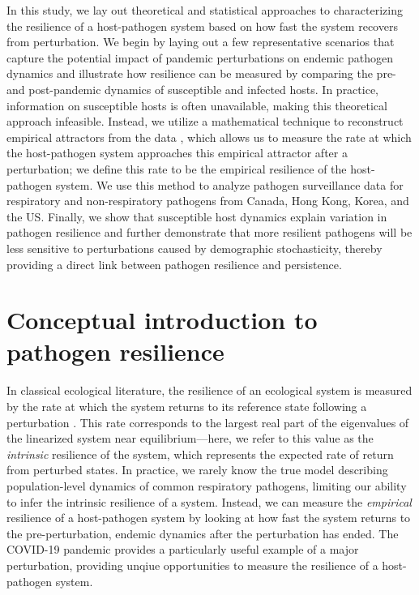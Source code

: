 \documentclass[12pt]{article}
\begin{document}
In this study, we lay out theoretical and statistical approaches to characterizing the resilience of a host-pathogen system based on how fast the system recovers from perturbation.
We begin by laying out a few representative scenarios that capture the potential impact of pandemic perturbations on endemic pathogen dynamics and illustrate how resilience can be measured by comparing the pre- and post-pandemic dynamics of susceptible and infected hosts.
In practice, information on susceptible hosts is often unavailable, making this theoretical approach infeasible.
Instead, we utilize a mathematical technique to reconstruct empirical attractors from the data \citep{takens2006detecting}, which allows us to measure the rate at which the host-pathogen system approaches this empirical attractor after a perturbation;
we define this rate to be the empirical resilience of the host-pathogen system.
We use this method to analyze pathogen surveillance data for respiratory and non-respiratory pathogens from Canada, Hong Kong, Korea, and the US.
Finally, we show that susceptible host dynamics explain variation in pathogen resilience and further demonstrate that more resilient pathogens will be less sensitive to perturbations caused by demographic stochasticity, thereby providing a direct link between pathogen resilience and persistence. 
 
\section*{Conceptual introduction to pathogen resilience}

In classical ecological literature, the resilience of an ecological system is measured by the rate at which the system returns to its reference state following a perturbation \citep{pimm1979structure, neubert1997alternatives,gunderson2000ecological,dakos2022ecological}.
This rate corresponds to the largest real part of the eigenvalues of the linearized system near equilibrium---here, we refer to this value as the \emph{intrinsic} resilience of the system, which represents the expected rate of return from perturbed states.
In practice, we rarely know the true model describing population-level dynamics of common respiratory pathogens, limiting our ability to infer the intrinsic resilience of a system.
Instead, we can measure the \emph{empirical} resilience of a host-pathogen system by looking at how fast the system returns to the pre-perturbation, endemic dynamics after the perturbation has ended.
The COVID-19 pandemic provides a particularly useful example of a major perturbation, providing unqiue opportunities to measure the resilience of a host-pathogen system.
\end{document}
